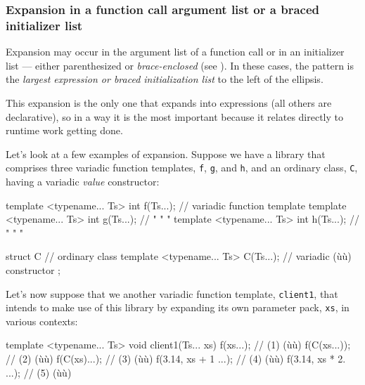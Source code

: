 \subsubsection[Expansion in a function call argument list or a braced initializer list]{Expansion in a function call argument list or a braced initializer list}\label{expansion-in-a-function-call-argument-list-or-a-braced-initializer-list}

Expansion may occur in the argument list of a function call or in an
initializer list --- either parenthesized or \emph{brace-enclosed} (see
). In these cases, the pattern is the
\emph{largest expression or braced initialization list} to the left of
the ellipsis.

This expansion is the only one that expands into expressions (all others
are declarative), so in a way it is the most important because it
relates directly to runtime work getting done.

Let's look at a few examples of expansion. Suppose we have a library
that comprises three variadic function templates, \lstinline!f!,
\lstinline!g!, and \lstinline!h!, and an ordinary class, \lstinline!C!, having a
variadic \emph{value} constructor:

\begin{emcppslisting}
template <typename... Ts> int f(Ts...);  // variadic function template
template <typename... Ts> int g(Ts...);  //    "        "        "
template <typename... Ts> int h(Ts...);  //    "        "        "

struct C                                 // ordinary class
{
    template <typename... Ts> C(Ts...);  // variadic (ù{}ù) constructor
};
\end{emcppslisting}
    

\noindent Let's now suppose that we another variadic function template,
\lstinline!client1!, that intends to make use of this library by expanding
its own parameter pack, \lstinline!xs!, in various contexts:

\begin{emcppslisting}
template <typename... Ts>
void client1(Ts... xs)
{
    f(xs...);                   // (1) (ù{}ù)
    f(C(xs...));                // (2) (ù{}ù)
    f(C(xs)...);                // (3) (ù{}ù)
    f(3.14, xs + 1 ...);        // (4) (ù{}ù)
    f(3.14, xs * 2. ...);       // (5) (ù{}ù)
}
\end{emcppslisting}
    

